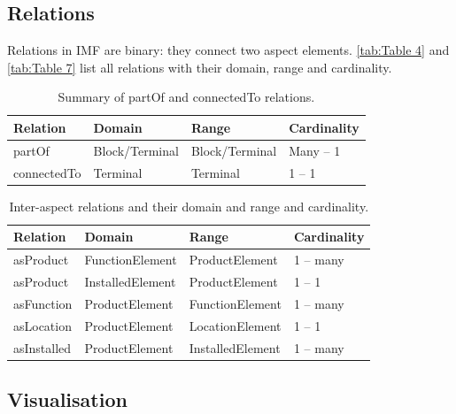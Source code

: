 \documentclass[../main.tex]{subfiles}
\begin{document}
\subsection{Relations  }
Relations in IMF are binary: they connect two aspect elements.
\autoref{tab:Table 4} and
\autoref{tab:Table 7} list all relations with their domain, range and cardinality. 

\begin{table}[htb]
  \centering
  \caption{Summary of partOf and connectedTo relations.}\label{tab:Table 4}
  \begin{tabularx}{\textwidth}{XXXX}
    \toprule
    {\bfseries Relation} &
    {\bfseries Domain} &
    {\bfseries Range} &
    {\bfseries Cardinality}\\
    \midrule
    {partOf} &
    {Block/Terminal} &
    {Block/Terminal} &
    {Many -- 1}\\
    {connectedTo} &
    {Terminal} &
    {Terminal} &
    {1 -- 1}\\
  \bottomrule\end{tabularx}
\end{table}


\begin{table}[htb]\centering\caption{Inter-aspect relations and their domain and range and
    cardinality.}\label{tab:Table 7}
  \begin{tabularx}{\textwidth}{XXXX}
        \toprule
    {\bfseries Relation} &
    {\bfseries Domain} &
    {\bfseries Range} &
    {\bfseries Cardinality}\\\midrule
    {{asProduct}} &
    {FunctionElement} &
    {ProductElement} &
    {1 -- many}\\
    {asProduct} &
    {InstalledElement} &
    {ProductElement} &
    {1 -- 1}\\
    {{asFunction}} &
    {ProductElement} &
    {FunctionElement} &
    {1 -- many}\\
    {asLocation} &
    {ProductElement} &
    {LocationElement} &
    {1 -- 1}\\
    {asInstalled} &
    {ProductElement} &
    {InstalledElement} &
    {1 -- many}\\
  \bottomrule\end{tabularx}
\end{table}

\subsection{Visualisation}
\end{document}
